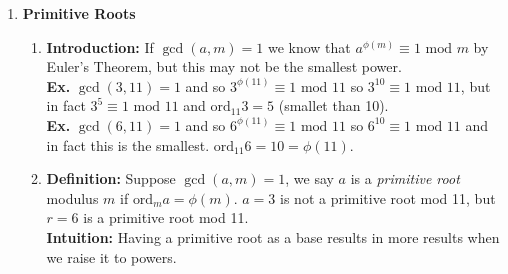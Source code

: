\documentclass[class=article, crop=false]{standalone}
\begin{document}
\begin{enumerate}
\begin{enumerate}[(a)]
	\item \textbf{Theorem:} We have $a^x \equiv a^y \mbox{ mod }m$ if and only if 
	$\mbox{ord}_m a \mid (x-y)$ if and only if $x\equiv y\mbox{ mod }\mbox{ord}_m a$. 
	i.e. Exponents work mod $\mbox{ord}_m a$. \\
	\textbf{Ex.} $\mbox{ord}_{11} 3 = 5$ so $3^x \equiv 3^y \mbox{ mod } 11$ if and only if
	$x\equiv y\mbox{ mod }\mbox{ord}_{11} 3$ ($x\equiv y\mbox{ mod }5$).
	\begin{proof}
		$ $\\
		$\rightarrow$ Suppose $a^x \equiv a^y \mbox{ mod }m$ without loss of generality, assume
		$x>y$. Since $\gcd(a,m)=1$ we can cancel $a^y$ from each side to get $a^{x-y} \equiv 1\mbox{ mod } m$.
		By (b) above then $x-y\equiv 0\mbox{ mod } \mbox{ord}_m a$. \\\\
		$\leftarrow$ Suppose $x\equiv y\mbox{ mod }\mbox{ord}_m a$, then
		$x=y+k\mbox{ord}_m a$ for some $k$. Then
		$a^x\equiv a^y a^{k\mbox{ord}_m a} \equiv a^y \left(a^{\mbox{ord}_m a}\right)^k \equiv a^y \cdot 1 \equiv a^y\mbox{ mod } m$.
	\end{proof}
	\noindent\textbf{Summary Ex.}
	We saw $\mbox{ord}_{11} 3 = 5$. So $3^x$ repeats every $5^{\text{th}}$ power mod 11
	and $3^5 \equiv 1\mbox{ mod }11$.

\end{enumerate}

\item \textbf{Primitive Roots}
\begin{enumerate}
	\item \textbf{Introduction:} If $\gcd(a,m)=1$ we know that $a^{\phi(m)}\equiv 1\mbox{ mod }m$ by
	Euler's Theorem, but this may not be the smallest power. \\
	\textbf{Ex.} $\gcd(3,11)=1$ and so $3^{\phi(11)}\equiv 1\mbox{ mod }11$ so $3^{10}\equiv 1\mbox{ mod }11$,
	but in fact $3^{5}\equiv 1\mbox{ mod }11$ and $\mbox{ord}_{11} 3 = 5$ (smallet than 10). \\
	\textbf{Ex.} $\gcd(6,11)=1$ and so $6^{\phi(11)}\equiv 1\mbox{ mod }11$ so $6^{10} \equiv 1\mbox{ mod }11$
	and in fact this is the smallest. $\mbox{ord}_{11} 6=10=\phi(11)$.

	\item \textbf{Definition:} Suppose $\gcd(a,m) =1$, we say $a$ is a
	\textit{primitive root} modulus $m$ if $\mbox{ord}_m a = \phi(m)$. $a=3$ is not a primitive root mod 11,
	but $r=6$ is a primitive root mod 11. \\
	\textbf{Intuition:} Having a primitive root as a base results in more results when we raise it to powers.


\end{enumerate}
\end{enumerate}
\end{document}
